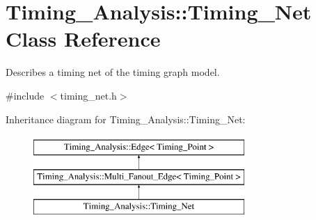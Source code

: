 \hypertarget{classTiming__Analysis_1_1Timing__Net}{\section{Timing\-\_\-\-Analysis\-:\-:Timing\-\_\-\-Net Class Reference}
\label{classTiming__Analysis_1_1Timing__Net}
}


Describes a timing net of the timing graph model.  




{\ttfamily \#include $<$timing\-\_\-net.\-h$>$}

Inheritance diagram for Timing\-\_\-\-Analysis\-:\-:Timing\-\_\-\-Net\-:\begin{figure}[H]
\begin{center}
\leavevmode
\includegraphics[height=3.000000cm]{classTiming__Analysis_1_1Timing__Net}
\end{center}
\end{figure}
